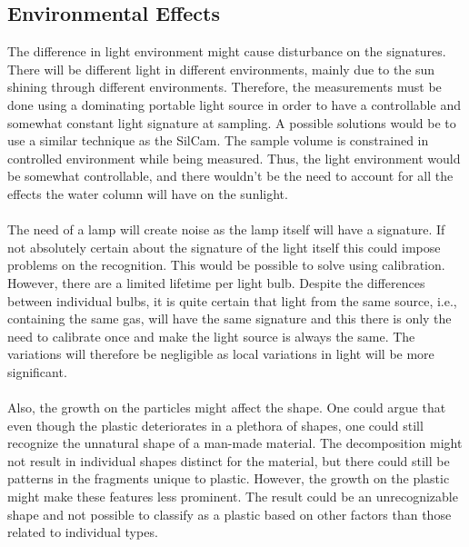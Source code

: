 \subsection{Environmental Effects}
The difference in light environment might cause disturbance on the signatures. There will be different light in different environments, mainly due to the sun shining through different environments. Therefore, the measurements must be done using a dominating portable light source in order to have a controllable and somewhat constant light signature at sampling. A possible solutions would be to use a similar technique as the SilCam. The sample volume is constrained in controlled environment while being measured. Thus, the light environment would be somewhat controllable, and there wouldn't be the need to account for all the effects the water column will have on the sunlight. 
\\\\
The need of a lamp will create noise as the lamp itself will have a signature. If not absolutely certain about the signature of the light itself this could impose problems on the recognition. This would be possible to solve using calibration. However, there are a limited lifetime per light bulb. Despite the differences between individual bulbs, it is quite certain that light from the same source, i.e., containing the same gas, will have the same signature and this there is only the need to calibrate once and make the light source is always the same. The variations will therefore be negligible as local variations in light will be more significant. 
\\\\
Also, the growth on the particles might affect the shape. One could argue that even though the plastic deteriorates in a plethora of shapes, one could still recognize the unnatural shape of a man-made material. The decomposition might not result in individual shapes distinct for the material, but there could still be patterns in the fragments unique to plastic. However, the growth on the plastic might make these features less prominent. The result could be an unrecognizable shape and not possible to classify as a plastic based on other factors than those related to individual types. 